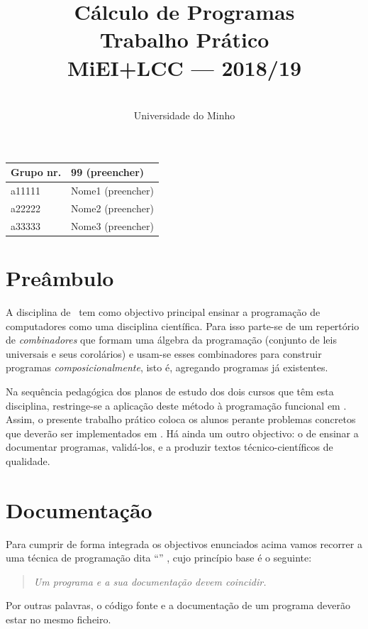 \documentclass[a4paper]{article}
\title{
       	    Cálculo de Programas
\\
       	Trabalho Prático
\\
       	MiEI+LCC --- 2018/19
}
\author{
       	\dium
\\
       	Universidade do Minho
}
\date\mydate
\begin{document}
\maketitle

\begin{center}\large
\begin{tabular}{ll}
\textbf{Grupo} nr. & 99 (preencher)
\\\hline
a11111 & Nome1 (preencher)
\\
a22222 & Nome2 (preencher)
\\
a33333 & Nome3 (preencher)
\end{tabular}
\end{center}

\section{Preâmbulo}

A disciplina de \CP\ tem como objectivo principal ensinar
a progra\-mação de computadores como uma disciplina científica. Para isso
parte-se de um repertório de \emph{combinadores} que formam uma álgebra da
programação (conjunto de leis universais e seus corolários) e usam-se esses
combinadores para construir programas \emph{composicionalmente}, isto é,
agregando programas já existentes.

Na sequência pedagógica dos planos de estudo dos dois cursos que têm
esta disciplina, restringe-se a aplicação deste método à programação
funcional em \Haskell. Assim, o presente trabalho prático coloca os
alunos perante problemas concretos que deverão ser implementados em
\Haskell.  Há ainda um outro objectivo: o de ensinar a documentar
programas, validá-los, e a produzir textos técnico-científicos de
qualidade.

\section{Documentação} Para cumprir de forma integrada os objectivos
enunciados acima vamos recorrer a uma técnica de programa\-ção dita
``'' \cite{Kn92}, cujo princípio base é o seguinte:
\begin{quote}\em Um programa e a sua documentação devem coincidir.
\end{quote} Por outras palavras, o código fonte e a documentação de um
programa deverão estar no mesmo ficheiro.
\end{document}
